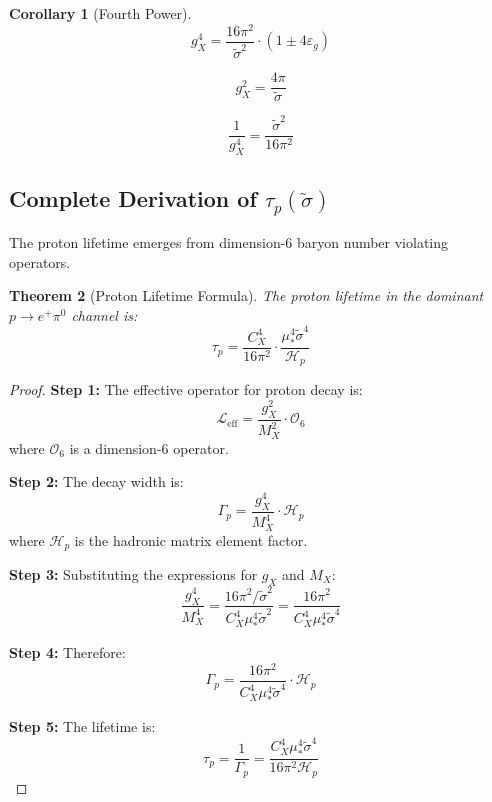 \documentclass[11pt,letterpaper]{article}
\newtheorem{theorem}{Theorem}[section]
\newtheorem{corollary}[theorem]{Corollary}
\newcommand{\st}{\tilde{\sigma}}
\newcommand{\eps}{\varepsilon}
\newcommand{\Hp}{\mathcal{H}_p}
\begin{document}
\begin{corollary}[Fourth Power]
\label{cor:gx-fourth}
\begin{equation}
g_X^4 = \frac{16\pi^2}{\st^2} \cdot (1 \pm 4\eps_g)
\label{eq:gx-fourth-power}
\end{equation}
\end{corollary}

\begin{equation}
g_X^2 = \frac{4\pi}{\st}
\label{eq:gx-squared}
\end{equation}

\begin{equation}
\frac{1}{g_X^4} = \frac{\st^2}{16\pi^2}
\label{eq:gx-inverse-fourth}
\end{equation}

\subsection{Complete Derivation of $\tau_p(\st)$}
\label{app:taup-derivation}

The proton lifetime emerges from dimension-6 baryon number violating operators.

\begin{theorem}[Proton Lifetime Formula]
\label{thm:taup-derivation}
The proton lifetime in the dominant $p \to e^+ \pi^0$ channel is:
\begin{equation}
\tau_p = \frac{C_X^4}{16\pi^2} \cdot \frac{\mu_*^4 \st^4}{\Hp}
\label{eq:taup-derivation-main}
\end{equation}
\end{theorem}

\begin{proof}
\textbf{Step 1:} The effective operator for proton decay is:
\begin{equation}
\mathcal{L}_{\text{eff}} = \frac{g_X^2}{M_X^2} \cdot \mathcal{O}_6
\label{eq:effective-operator}
\end{equation}
where $\mathcal{O}_6$ is a dimension-6 operator.

\textbf{Step 2:} The decay width is:
\begin{equation}
\Gamma_p = \frac{g_X^4}{M_X^4} \cdot \Hp
\label{eq:decay-width}
\end{equation}
where $\Hp$ is the hadronic matrix element factor.

\textbf{Step 3:} Substituting the expressions for $g_X$ and $M_X$:
\begin{equation}
\frac{g_X^4}{M_X^4} = \frac{16\pi^2/\st^2}{C_X^4 \mu_*^4 \st^2} = \frac{16\pi^2}{C_X^4 \mu_*^4 \st^4}
\label{eq:ratio-substitution}
\end{equation}

\textbf{Step 4:} Therefore:
\begin{equation}
\Gamma_p = \frac{16\pi^2}{C_X^4 \mu_*^4 \st^4} \cdot \Hp
\label{eq:gamma-p-result}
\end{equation}

\textbf{Step 5:} The lifetime is:
\begin{equation}
\tau_p = \frac{1}{\Gamma_p} = \frac{C_X^4 \mu_*^4 \st^4}{16\pi^2 \Hp}
\label{eq:taup-result}
\end{equation}
\end{proof}
\end{document}
